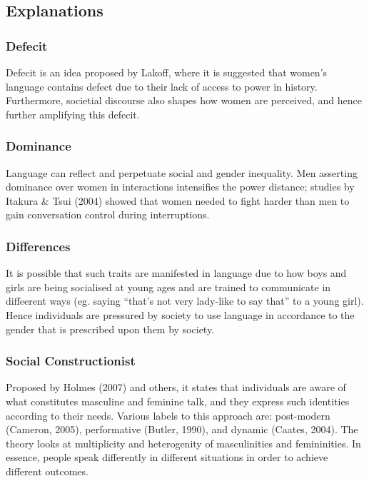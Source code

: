 \documentclass[../main.tex]{subfiles}
\begin{document}
        \subsection{Explanations}
            \subsubsection{Defecit}
            Defecit is an idea proposed by Lakoff, where it is suggested that women's language contains defect due to their lack of access to power in history. Furthermore, societial discourse also shapes how women are perceived, and hence further amplifying this defecit. 

            \subsubsection{Dominance}
            Language can reflect and perpetuate social and gender inequality. Men asserting dominance over women in interactions intensifies the power distance; studies by Itakura \& Tsui (2004) showed that women needed to fight harder than men to gain conversation control during interruptions.

            \subsubsection{Differences}
            It is possible that such traits are manifested in language due to how boys and girls are being socialised at young ages and are trained to communicate in diffeerent ways (eg. saying ``that's not very lady-like to say that'' to a young girl). Hence individuals are pressured by society to use language in accordance to the gender that is prescribed upon them by society. 

            \subsubsection{Social Constructionist}
            Proposed by Holmes (2007) and others, it states that individuals are aware of what constitutes masculine and feminine talk, and they express such identities according to their needs. Various labels to this approach are: post-modern (Cameron, 2005), performative (Butler, 1990), and dynamic (Caates, 2004). The theory looks at multiplicity and heterogenity of masculinities and femininities. In essence, people speak differently in different situations in order to achieve different outcomes.
\end{document}
